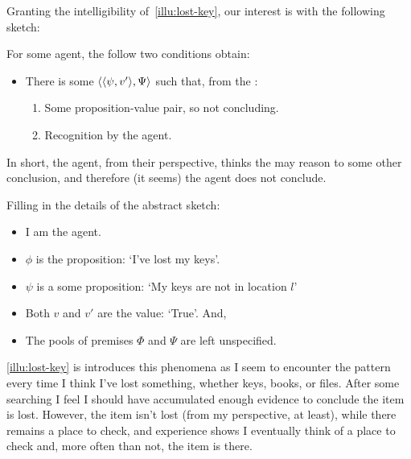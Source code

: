 \begin{note}
  Granting the intelligibility of~\autoref{illu:lost-key}, our interest is with the following sketch:

  \begin{sketch}
    \label{sketch:zS:fail}
    For some agent, the follow two conditions obtain:

    \begin{itemize}
    \item
      There is some \(\langle \langle \psi, v' \rangle, \Psi \rangle\) such that, from the \agpe{}:
      \begin{enumerate}
      \item
        Some proposition-value pair, so not concluding.
      \item
        Recognition by the agent.
      \end{enumerate}
    \end{itemize}
  \vspace{-\baselineskip}
  \end{sketch}

  In short, the agent, from their perspective, thinks the may reason to some other conclusion, and therefore (it seems) the agent does not conclude.

  Filling in the details of the abstract sketch:
  \begin{itemize}[noitemsep]
  \item
    I am the agent.
  \item
    \(\phi\) is the proposition: `I've lost my keys'.
  \item
    \(\psi\) is a some proposition: `My keys are not in location \(l\)'
  \item
    Both \(v\) and \(v'\) are the value: `True'.
    And,
  \item
    The pools of premises \(\Phi\) and \(\Psi\) are left unspecified.
  \end{itemize}
\end{note}

\begin{note}
  \autoref{illu:lost-key} is introduces this phenomena as I seem to encounter the pattern every time I think I've lost something, whether keys, books, or files.
  After some searching I feel I should have accumulated enough evidence to conclude the item is lost.
  However, the item isn't lost (from my perspective, at least), while there remains a place to check, and experience shows I eventually think of a place to check and, more often than not, the item is there.
\end{note}

